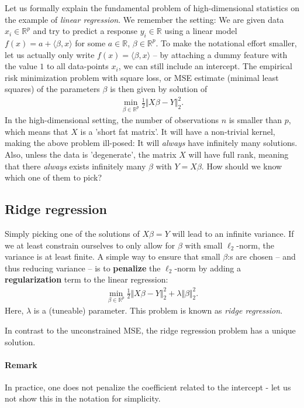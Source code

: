 \documentclass{article}
\newcommand{\sprod}[1]{\langle #1 \rangle}
\newcommand{\R}{\mathbb{R}}
\newcommand{\norm}[1]{\Vert #1 \Vert}
\begin{document}
Let us formally explain the fundamental problem of high-dimensional statistics on the example of \emph{linear regression}. We remember the setting: We are given data $x_i \in \R^p$ and try to predict a response $y_i\in \R$ using a linear model $f(x)= a+ \sprod{\beta,x}$ for some $a\in \R$, $\beta \in \R^p$. To make the notational effort smaller, let us actually only write $f(x)=\sprod{\beta,x}$ -- by attaching a dummy feature with the value $1$ to all data-points $x_i$, we can still include an intercept. The empirical risk minimization problem with square loss, or MSE estimate (minimal least squares) of the parameters $\beta$ is then given by solution of
\begin{align*}
    \min_{\beta \in \R^p} \tfrac{1}{2}\norm{X\beta-Y}_2^2.
\end{align*}
In the high-dimensional setting, the number of observations $n$ is smaller than $p$, which means that $X$ is a 'short fat matrix'. It will have  a non-trivial kernel, making the above problem ill-posed: It will \emph{always} have infinitely many solutions. Also, unless the data is 'degenerate', the matrix $X$ will have full rank, meaning that there \emph{always} exists infinitely many $\beta$ with $Y=X\beta$. How should we know which one of them to pick? 

\subsection{Ridge regression}
Simply picking one of the solutions of $X\beta = Y$ will lead to an infinite variance. If we at least constrain ourselves to only allow for $\beta$ with small $\ell_2$-norm, the variance is at least finite. A simple way to ensure that small $\beta$:s are chosen -- and thus reducing variance -- is to \textbf{penalize} the $\ell_2$-norm by adding a \textbf{regularization} term to the linear regression:
\begin{align}
    \min_{\beta \in \R^p} \tfrac{1}{2}\norm{X\beta-Y}_2^2 + \lambda \norm{\beta}_2^2. \label{eq:ridgeregression}
\end{align}
Here, $\lambda$ is a (tuneable) parameter. This problem is known as \emph{ridge regression}.

In contrast to the unconstrained MSE, the ridge regression problem has a unique solution.

\paragraph{Remark} In practice, one does not penalize the coefficient related to the intercept - let us not show this in the notation for simplicity.
\end{document}
